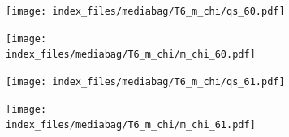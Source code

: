 \documentclass[
  11pt,
  letterpaper,
]{scrreprt}
\begin{document}
\begin{figure}

\begin{minipage}{0.50\linewidth}

\begin{figure}[H]

{\centering \texttt{[image: index\_files/mediabag/T6\_m\_chi/qs\_60.pdf]}

}


\end{figure}%

\end{minipage}%
%
\begin{minipage}{0.50\linewidth}

\begin{figure}[H]

{\centering \texttt{[image: index\_files/mediabag/T6\_m\_chi/m\_chi\_60.pdf]}

}


\end{figure}%

\end{minipage}%

\end{figure}%

\begin{figure}

\begin{minipage}{0.50\linewidth}

\begin{figure}[H]

{\centering \texttt{[image: index\_files/mediabag/T6\_m\_chi/qs\_61.pdf]}

}


\end{figure}%

\end{minipage}%
%
\begin{minipage}{0.50\linewidth}

\begin{figure}[H]

{\centering \texttt{[image: index\_files/mediabag/T6\_m\_chi/m\_chi\_61.pdf]}

}


\end{figure}%

\end{minipage}%

\end{figure}%
\end{document}

